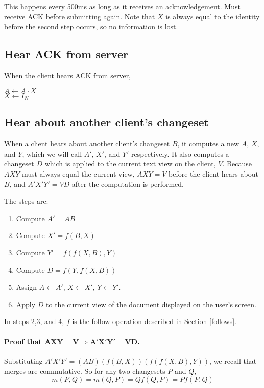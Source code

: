 \documentclass{article}
\begin{document}
This happens every 500ms as long as it receives an
acknowledgement.  Must receive ACK before submitting
again.  Note that $X$ is always equal to the identity
before the second step occurs, so no information is lost.

\subsection{Hear ACK from server}

When the client hears ACK from server,

$A \leftarrow A\cdot X$ \\
$X \leftarrow I_N$

\subsection{Hear about another client's changeset}

When a client hears about another client's changeset $B$,
it computes a new $A$, $X$, and $Y$, which we will call
$A'$, $X'$, and $Y'$ respectively.  It also computes a
changeset $D$ which is applied to the current text view on
the client, $V$.  Because $AXY$ must always equal the
current view, $AXY=V$ before the client hears about $B$,
and $A'X'Y'=VD$ after the computation is performed.

The steps are:

\begin{enumerate}
\item Compute $A' = AB$
\item Compute $X' = f(B,X)$
\item Compute $Y' = f(f(X,B), Y)$
\item Compute $D=f(Y,f(X,B))$
\item Assign $A \leftarrow A'$, $X \leftarrow X'$, $Y \leftarrow Y'$.
\item Apply $D$ to the current view of the document
  displayed on the user's screen.
\end{enumerate}

In steps 2,3, and 4, $f$ is the follow operation described
in Section \ref{follows}.

\paragraph{Proof that $\mathbf{AXY=V \Rightarrow A'X'Y'=VD}$.}
Substituting $A'X'Y'=(AB)(f(B,X))(f(f(X,B),Y))$, we
recall that merges are commutative.  So for any two
changesets $P$ and $Q$, 
$$m(P,Q)=m(Q,P)=Qf(Q,P)=Pf(P,Q)$$
\end{document}
